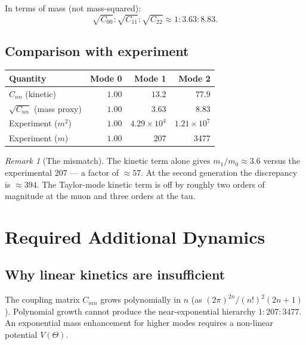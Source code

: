 \documentclass[12pt,a4paper]{article}
\theoremstyle{remark}
\newtheorem{remark}[theorem]{Remark}
\begin{document}
In terms of mass (not mass-squared):
\begin{equation}
  \sqrt{C_{00}} : \sqrt{C_{11}} : \sqrt{C_{22}}
  \approx
  1 : 3.63 : 8.83.
\end{equation}

\subsection{Comparison with experiment}

\begin{center}
\begin{tabular}{lrrr}
\hline
Quantity & Mode 0 & Mode 1 & Mode 2 \\
\hline
$C_{nn}$ (kinetic) & $1.00$ & $13.2$ & $77.9$ \\
$\sqrt{C_{nn}}$ (mass proxy) & $1.00$ & $3.63$ & $8.83$ \\
Experiment ($m^2$) & $1.00$ & $4.29\times10^4$ & $1.21\times10^7$ \\
Experiment ($m$) & $1.00$ & $207$ & $3477$ \\
\hline
\end{tabular}
\end{center}

\begin{remark}[The mismatch]
The kinetic term alone gives $m_1/m_0 \approx 3.6$ versus the experimental
$207$ — a factor of $\approx 57$.  At the second generation the
discrepancy is $\approx 394$.  The Taylor-mode kinetic term is off by
roughly two orders of magnitude at the muon and three orders at the tau.
\end{remark}

\section{Required Additional Dynamics}
\label{sec:additional}

\subsection{Why linear kinetics are insufficient}

The coupling matrix $C_{mn}$ grows polynomially in $n$ (as $(2\pi)^{2n}/(n!)^2(2n+1)$).
Polynomial growth cannot produce the near-exponential hierarchy
$1:207:3477$.  An exponential mass enhancement for higher modes requires
a non-linear potential $V(\Theta)$.
\end{document}
